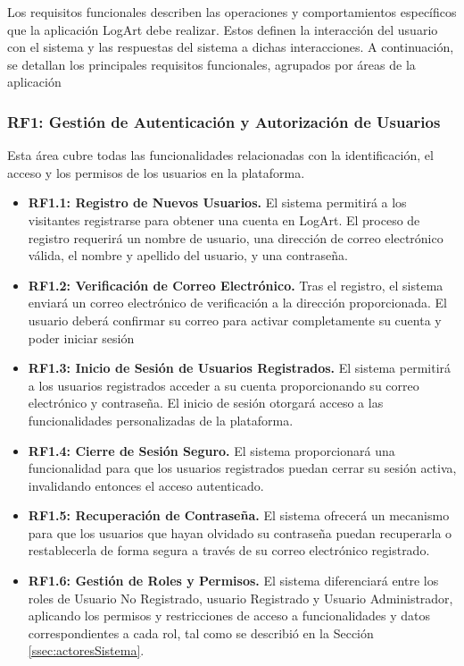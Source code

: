 Los requisitos funcionales describen las operaciones y comportamientos específicos que la aplicación LogArt debe realizar. Estos definen la interacción del usuario con el sistema y las respuestas del sistema a dichas interacciones. A continuación, se detallan los principales requisitos funcionales, agrupados por áreas de la aplicación

\subsubsection{RF1: Gestión de Autenticación y Autorización de Usuarios}
\label{rf:autenticacion}
Esta área cubre todas las funcionalidades relacionadas con la identificación, el acceso y los permisos de los usuarios en la plataforma.
\begin{itemize}
    \item \textbf{RF1.1: Registro de Nuevos Usuarios.} El sistema permitirá a los visitantes registrarse para obtener una cuenta en LogArt. El proceso de registro requerirá un nombre de usuario, una dirección de correo electrónico válida, el nombre y apellido del usuario, y una contraseña.
    \item \textbf{RF1.2: Verificación de Correo Electrónico.} Tras el registro, el sistema enviará un correo electrónico de verificación a la dirección proporcionada. El usuario deberá confirmar su correo para activar completamente su cuenta y poder iniciar sesión
    \item \textbf{RF1.3: Inicio de Sesión de Usuarios Registrados.} El sistema permitirá a los usuarios registrados acceder a su cuenta proporcionando su correo electrónico y contraseña. El inicio de sesión otorgará acceso a las funcionalidades personalizadas de la plataforma.
    \item \textbf{RF1.4: Cierre de Sesión Seguro.} El sistema proporcionará una funcionalidad para que los usuarios registrados puedan cerrar su sesión activa, invalidando entonces el acceso autenticado.
    \item \textbf{RF1.5: Recuperación de Contraseña.} El sistema ofrecerá un mecanismo para que los usuarios que hayan olvidado su contraseña puedan recuperarla o restablecerla de forma segura a través de su correo electrónico registrado.
    \item \textbf{RF1.6: Gestión de Roles y Permisos.} El sistema diferenciará entre los roles de Usuario No Registrado, usuario Registrado y Usuario Administrador, aplicando los permisos y restricciones de acceso a funcionalidades y datos correspondientes a cada rol, tal como se describió en la Sección \ref{ssec:actoresSistema}.
\end{itemize}


